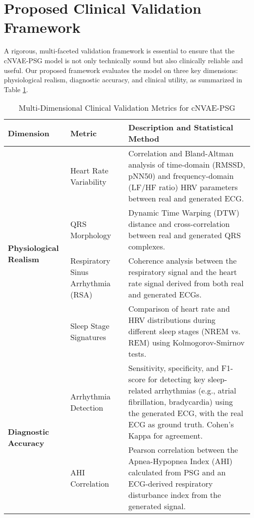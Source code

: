 \documentclass[11pt,en]{elegantpaper}
\begin{document}
\section{Proposed Clinical Validation Framework}

A rigorous, multi-faceted validation framework is essential to ensure that the cNVAE-PSG model is not only technically sound but also clinically reliable and useful. Our proposed framework evaluates the model on three key dimensions: physiological realism, diagnostic accuracy, and clinical utility, as summarized in Table \ref{tab:validation_metrics}.

\begin{table}[H]
    \centering
    \caption{Multi-Dimensional Clinical Validation Metrics for cNVAE-PSG}
    \label{tab:validation_metrics}
    \begin{tabular}{p{} p{} p{}}
        \toprule
        \textbf{Dimension} & \textbf{Metric} & \textbf{Description and Statistical Method} \\
        \midrule
        \multirow{4}{*}{\textbf{Physiological Realism}} 
        & Heart Rate Variability & Correlation and Bland-Altman analysis of time-domain (RMSSD, pNN50) and frequency-domain (LF/HF ratio) HRV parameters between real and generated ECG. \\
        \cline{2-3}
        & QRS Morphology & Dynamic Time Warping (DTW) distance and cross-correlation between real and generated QRS complexes. \\
        \cline{2-3}
        & Respiratory Sinus Arrhythmia (RSA) & Coherence analysis between the respiratory signal and the heart rate signal derived from both real and generated ECGs. \\
        \cline{2-3}
        & Sleep Stage Signatures & Comparison of heart rate and HRV distributions during different sleep stages (NREM vs. REM) using Kolmogorov-Smirnov tests. \\
        \midrule
        \multirow{3}{*}{\textbf{Diagnostic Accuracy}}
        & Arrhythmia Detection & Sensitivity, specificity, and F1-score for detecting key sleep-related arrhythmias (e.g., atrial fibrillation, bradycardia) using the generated ECG, with the real ECG as ground truth. Cohen's Kappa for agreement. \\
        \cline{2-3}
        & AHI Correlation & Pearson correlation between the Apnea-Hypopnea Index (AHI) calculated from PSG and an ECG-derived respiratory disturbance index from the generated signal. \\

\end{tabular}
\end{table}
\end{document}
